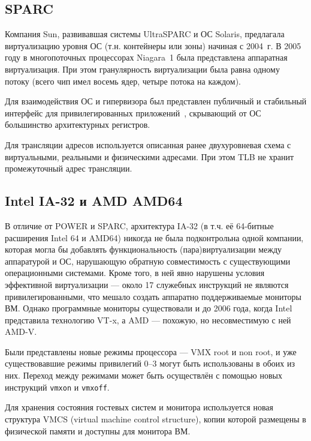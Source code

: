\subsection{SPARC}

Компания Sun, развивавшая системы UltraSPARC и ОС Solaris, предлагала виртуализацию уровня ОС (т.н. контейнеры или зоны) начиная с 2004~г. В 2005 году в многопоточных процессорах Niagara~1 была представлена аппаратная виртуализация. При этом гранулярность виртуализации была равна одному потоку (всего чип имел восемь ядер, четыре потока на каждом). 

Для взаимодействия ОС и гипервизора был представлен публичный и стабильный интерфейс для привилегированных приложений~\cite{sun4v-spec}, скрывающий от ОС большинство архитектурных регистров.

Для трансляции адресов используется описанная ранее двухуровневая схема с виртуальными, реальными и физическими адресами. При этом TLB не хранит промежуточный адрес трансляции. 

\subsection{Intel IA-32 и AMD AMD64}

В отличие от POWER и SPARC, архитектура IA-32 (в т.ч. её 64-битные расширения Intel 64 и AMD64) никогда не была подконтрольна одной компании, которая могла бы добавлять функциональность (пара)виртуализации между аппаратурой и ОС, нарушающую обратную совместимость с существующими операционными системами. Кроме того, в ней явно нарушены условия эффективной виртуализации --- около 17 служебных инструкций не являются привилегированными, что мешало создать аппаратно поддерживаемые мониторы ВМ. Однако программные мониторы существовали и до 2006 года, когда Intel представила технологию VT-x, а AMD --- похожую, но несовместимую с ней AMD-V. 

Были представлены новые режимы процессора --- VMX root и non root, и уже существовавшие режимы привилегий 0--3 могут быть использованы в обоих из них. Переход между режимами может быть осуществлён с помощью новых инструкций \texttt{vmxon} и \texttt{vmxoff}. 

Для хранения состояния гостевых систем и монитора используется новая структура VMCS (\abbr virtual machine control structure), копии которой размещены в физической памяти и доступны для монитора ВМ.

